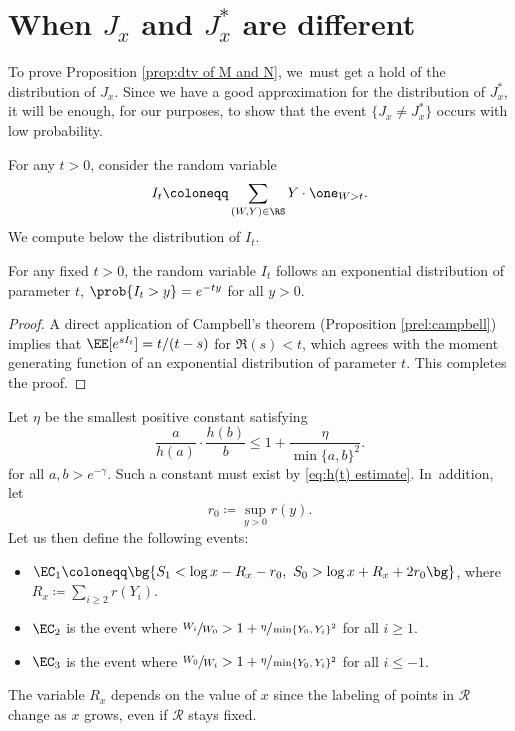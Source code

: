\section{When \texorpdfstring{$J_x$ and $J_x^*$}{Jxx} are different}
\label{sec:different J and J*}

To prove Proposition \ref{prop:dtv of M and N}, we~must get a hold of the distribution of $J_x$. Since we have a good approximation for the distribution of $J_x^*$, it will be enough, for our purposes, to show that the event $\{J_x\neq J_x^*\}$ occurs with low probability.

For any $t > 0$, consider the random variable
\[
I_t \coloneqq \sum_{(W,Y)\in \RS} Y\cdot \one_{W>t}.
\]
We compute below the distribution of $I_t$.

\begin{prop}
\label{prop:icexponential}
For any fixed $t > 0$, the random variable $I_t$ follows an exponential distribution of parameter $t$, \ie $\prob{I_t > y} = e^{-ty}$ for all $y > 0$.
\end{prop}

\begin{proof}
A direct application of Campbell's theorem (Proposition \ref{prel:campbell}) implies that $\EE[e^{sI_t}]=t/(t-s)$ for $\Re(s)<t$, which agrees with the moment generating function of an exponential distribution of parameter $t$. This completes the proof.
\end{proof}

Let $\eta$ be the smallest positive constant satisfying
\[
\frac{a}{h(a)}\cdot \frac{h(b)}{b} \le 1 + \frac{\eta}{\min\{a,b\}^2}.
\]
for all $a, b > e^{-\gamma}$. Such a constant must exist by \eqref{eq:h(t) estimate}. In~addition, let
\[
r_0\coloneqq \sup_{y > 0} r(y).
\]
Let us then define the following events:

\begin{itemize}
\item $\EC_1\coloneqq \bg\{ S_1<\log x-R_x-r_0,\ S_0>\log x+R_x+2r_0\bg\}$, where $R_x\coloneqq \sum_{i\ge2} r(Y_i)$.

\item $\EC_2$ is the event where $\sfrac{W_i}{W_0} > 1 + \sfrac{\eta}{\min\{Y_0,Y_i\}^2}$ for all $i \ge 1$.

\item $\EC_3$ is the event where $\sfrac{W_0}{W_i} > 1 + \sfrac{\eta}{\min\{Y_0,Y_i\}^2}$ for all $i \le -1$.
\end{itemize}
The variable $R_x$ depends on the value of $x$ since the labeling of points in $\mathscr R$ change as $x$ grows, even if $\mathscr R$ stays fixed.


